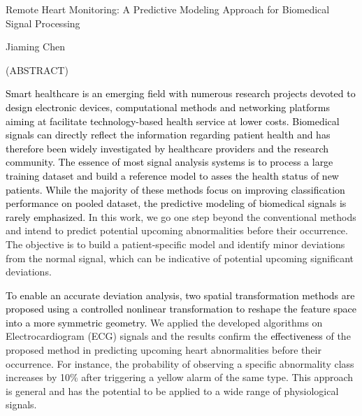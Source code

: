 
\begin{center}

\vfill

{\large Remote Heart Monitoring: A Predictive Modeling Approach for Biomedical Signal Processing }


Jiaming Chen

{(ABSTRACT)}




\vfill

\end{center}

\textcolor{black}{Smart healthcare is an emerging field with numerous research projects devoted to design electronic devices, computational methods and networking platforms aiming at facilitate technology-based health service at lower costs. Biomedical signals can directly reflect the information regarding patient health and has therefore been widely investigated by healthcare providers and the research community. The essence of most signal analysis systems is to process a large training dataset and build a reference model to asses the health status of new patients. While the majority of these methods focus on improving classification performance on pooled dataset, the predictive modeling of biomedical signals is rarely emphasized.} %
In this work, we go one step beyond the conventional methods and intend to predict potential upcoming abnormalities before their occurrence. The objective is to build a patient-specific model and identify minor deviations from the normal signal, which can be indicative of potential upcoming significant deviations. 

\textcolor{black}{To enable an accurate deviation analysis, two spatial transformation methods are proposed using a controlled nonlinear transformation to reshape the feature space into a more symmetric geometry.} %
We applied the developed algorithms on Electrocardiogram (ECG) signals and the results confirm the \textcolor{black}{effectiveness} of the proposed method in predicting upcoming heart abnormalities before their occurrence. For instance, the probability of observing a specific abnormality class increases by 10\% after triggering a yellow alarm of the same type. This approach is general and has the potential to be applied to a wide range of physiological signals.


